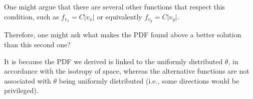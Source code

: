 \documentclass{article}
\begin{document}
One might argue that there are several other functions that respect this condition, such as \(f_{v_x} = C \vert v_x \vert\) or equivalently \(f_{v_y} = C \vert v_y \vert\).

Therefore, one might ask what makes the PDF found above a better solution than this second one?

It is because the PDF we derived is linked to the uniformly distributed \(\theta\), in accordance with the isotropy of space, whereas the alternative functions are not associated with \(\theta\) being uniformly distributed (i.e., some directions would be privileged).





\end{document}
